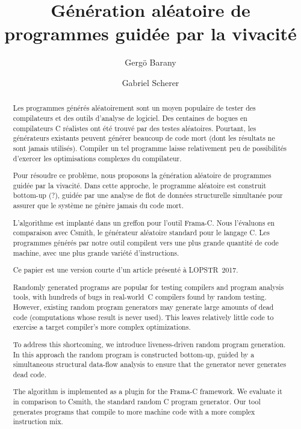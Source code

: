 \documentclass[a4paper]{easychair}
\title{Génération aléatoire de programmes guidée par la vivacité}
\author{Gergö Barany\inst{1} \and Gabriel Scherer\inst{2}}
\institute{
Inria Paris \\
\email{gergo.barany@inria.fr}
\and
Inria Saclay \\
\email{gabriel.scherer@gmail.com}
}
\begin{document}
\maketitle
\thispagestyle{plain}

\begin{abstract}
Les programmes générés aléatoirement sont un moyen populaire de tester des
compilateurs et des outils d'analyse de logiciel. Des centaines de bogues en
compilateurs C réalistes ont été trouvé par des testes aléatoires. Pourtant,
les générateurs existants peuvent générer beaucoup de code mort (dont les
résultats ne sont jamais utilisés). Compiler un tel programme laisse
relativement peu de possibilités d'exercer les optimisations complexes du
compilateur.

Pour résoudre ce problème, nous proposons la génération aléatoire de
programmes guidée par la vivacité. Dans cette approche, le programme
aléatoire est construit bottom-up (?), guidée par une analyse de flot de
données structurelle simultanée pour assurer que le système ne génère jamais
du code mort.

L'algorithme est implanté dans un greffon pour l'outil Frama-C. Nous
l'évaluons en comparaison avec Csmith, le générateur aléatoire standard pour
le langage C. Les programmes générés par notre outil compilent vers une plus
grande quantité de code machine, avec une plus grande variété
d'instructions.

Ce papier est une version courte d'un article présenté à LOPSTR~2017.
\end{abstract}

\begin{abstract}
Randomly generated programs are popular for testing compilers and program
analysis tools, with hundreds of bugs in real-world~C compilers found by
random testing. However, existing random program generators may generate
large amounts of dead code (computations whose result is never used). This
leaves relatively little code to exercise a target compiler's more complex
optimizations.

To address this shortcoming, we introduce liveness-driven random program
generation. In this approach the random program is constructed bottom-up,
guided by a simultaneous structural data-flow analysis to ensure that the
generator never generates dead code.

The algorithm is implemented as a plugin for the Frama-C framework. We
evaluate it in comparison to Csmith, the standard random C program
generator. Our tool generates programs that compile to more machine code
with a more complex instruction mix.
\end{abstract}
\end{document}

